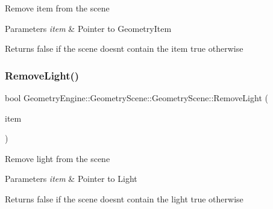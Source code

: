 Remove item from the scene 
\begin{DoxyParams}{Parameters}
{\em item} & Pointer to Geometry\+Item \\
\hline
\end{DoxyParams}
\begin{DoxyReturn}{Returns}
false if the scene doesn\textquotesingle{}t contain the item true otherwise 
\end{DoxyReturn}
\mbox{\label{class_geometry_engine_1_1_geometry_scene_1_1_geometry_scene_ab0217afe0c403087d3be028f012b1125}} 
\subsubsection{\texorpdfstring{RemoveLight()}{RemoveLight()}}
{\footnotesize\ttfamily bool Geometry\+Engine\+::\+Geometry\+Scene\+::\+Geometry\+Scene\+::\+Remove\+Light (\begin{DoxyParamCaption}\item[{\mbox{\hyperlink{class_geometry_engine_1_1_geometry_world_item_1_1_geometry_light_1_1_light}{Geometry\+World\+Item\+::\+Geometry\+Light\+::\+Light}} $\ast$}]{item }\end{DoxyParamCaption})\hspace{0.3cm}{\ttfamily [virtual]}}

Remove light from the scene 
\begin{DoxyParams}{Parameters}
{\em item} & Pointer to Light \\
\hline
\end{DoxyParams}
\begin{DoxyReturn}{Returns}
false if the scene doesn\textquotesingle{}t contain the light true otherwise 
\end{DoxyReturn}
\mbox{\label{class_geometry_engine_1_1_geometry_scene_1_1_geometry_scene_a862a151509389f4f0c15e7ed4e3917c8}} 
